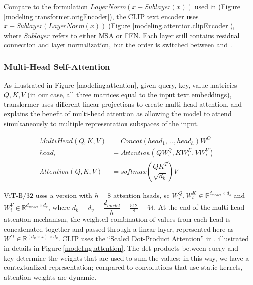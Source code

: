 Compare to the formulation $LayerNorm(x + Sublayer(x))$ used in \cite{attentionAllYouNeed} (Figure \ref{modeling.transformer.origEncoder}), the CLIP text encoder uses $x + Sublayer(LayerNorm(x))$ (Figure \ref{modeling.attention.clipEncoder}), where $Sublayer$ refers to either MSA or FFN. Each layer still contains residual connection and layer normalization, but the order is switched between \cite{attentionAllYouNeed} and \cite{CLIPpaper}. 

\subsubsection*{Multi-Head Self-Attention}
As illustrated in Figure \ref{modeling.attention}, given query, key, value matricies $Q,K,V$ (in our case, all three matrices equal to the input text embeddings), transformer uses different linear projections to create multi-head attention, and \citet{attentionAllYouNeed} explains the benefit of multi-head attention as allowing the model to attend simultaneously to multiple representation subspaces of the input.      

\begin{equation} \label{mha}
\begin{split}
    MultiHead(Q,K,V) & = Concat({head}_1,\dots,{head}_h)W^O \\
    {head}_i & = Attention(QW_i^{Q}, KW_i^{K}, VW_i^{V}) \\
    Attention(Q,K,V) & = softmax(\dfrac{QK^T}{\sqrt{d_k}})V 
\end{split}
\end{equation}

$\text{ViT-B}/32$ uses a version with $h = 8$ attention heads, so $W_i^{Q}, W_i^{K} \in \mathbb{R}^{d_{model} \times d_k}$ and $W_i^{V} \in \mathbb{R}^{d_{model} \times d_v}$, where $d_k = d_v = \dfrac{d_{model}}{h} = \frac{512}{8} = 64$. 
At the end of the multi-head attention mechanism, the weighted combination of values from each head is concatenated together and passed through a linear layer, represented here as $W^O \in \mathbb{R}^{(d_v \times h) \times d_v}$. 
CLIP uses the ``Scaled Dot-Product Attention'' in \cite{attentionAllYouNeed}, illustrated in details in Figure \ref{modeling.attention}. The dot products between query and key determine the weights that are used to sum the values; in this way, we have a contextualized representation; compared to convolutions that use static kernels, attention weights are dynamic.   

